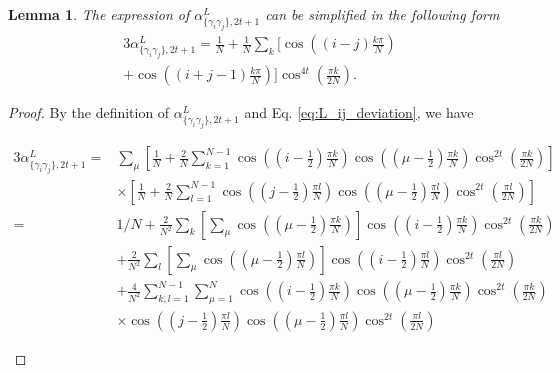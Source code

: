 \documentclass[showpacs,twocolumn,aps,prx,long bibliography,superscriptaddress,notitlepage]{revtex4-1}
\newtheorem{lemma}{Lemma}
\newcommand{\alpl}{\alpha_{\{\gamma_i\gamma_j\}, 2t+1}^{L}}
\begin{document}
\begin{lemma}
\label{lemma: simplification of alpha L}
The expression of $\alpl$ can be simplified in the following form
    \begin{equation}
    \label{eq: alpha L}
        \begin{aligned}
            3\alpl=\frac{1}{N}+\frac{1}{N} \sum_k\Big[\cos \left((i-j) \frac{k \pi}{N}\right) \\
        +\cos \left((i+j-1) \frac{k \pi}{N}\right)\Big] \cos ^{4 t}\left(\frac{\pi k}{2 N}\right).
        \end{aligned}
    \end{equation}
\end{lemma}
\begin{proof}
By the definition of $\alpl$ and Eq. \ref{eq:L_ij_deviation}, we have
\begin{widetext}

\begin{align}
    3\alpl =& \sum_\mu \left[ \frac{1}{N} + \frac{2}{N} \sum_{k=1}^{N-1} \cos \left(\left(i-\frac{1}{2}\right) \frac{\pi k}{N}\right) \cos \left(\left(\mu-\frac{1}{2}\right) \frac{\pi k}{N}\right) \cos ^{2 t} \left( \frac{\pi k}{2 N} \right)\right] \nonumber\\
     &\times\left[ \frac{1}{N} + \frac{2}{N} \sum_{l=1}^{N-1} \cos \left(\left(j-\frac{1}{2}\right) \frac{\pi l}{N}\right) \cos \left(\left(\mu-\frac{1}{2}\right) \frac{\pi l}{N}\right) \cos ^{2 t}\left( \frac{\pi l}{2 N} \right)  \right] \nonumber\\
     =& 1/N + \frac{2}{N^2} \sum_k \left[\sum_\mu \cos\left(\left(\mu-\frac{1}{2}\right) \frac{\pi k}{N}\right)  \right] 
     \cos \left(\left(i-\frac{1}{2}\right) \frac{\pi k}{N}\right) \cos ^{2 t} \left( \frac{\pi k}{2 N} \right) 
     \label{eq: zz anonymous 9}
     \\
     &+ \frac{2}{N^2} \sum_l \left[\sum_\mu \cos\left(\left(\mu-\frac{1}{2}\right) \frac{\pi l}{N}\right)  \right] 
     \cos \left(\left(i-\frac{1}{2}\right) \frac{\pi l}{N}\right) \cos ^{2 t} \left( \frac{\pi l}{2 N} \right) 
     \label{eq: zz anonymous 10}
     \\
     &+ \frac{4}{N^2} \sum_{k,l =1}^{N-1} \sum_{\mu = 1}^{N} \cos \left(\left(i-\frac{1}{2}\right) \frac{\pi k}{N}\right) \cos \left(\left(\mu-\frac{1}{2}\right) \frac{\pi k}{N}\right) \cos ^{2 t} \left( \frac{\pi k}{2 N} \right)  \nonumber\\
     &\times \cos \left(\left(j-\frac{1}{2}\right) \frac{\pi l}{N}\right) \cos \left(\left(\mu-\frac{1}{2}\right) \frac{\pi l}{N}\right) \cos ^{2 t}\left( \frac{\pi l}{2 N} \right)  
     \label{eq: calculation of alpha L}
\end{align}



\end{widetext}
\end{proof}
\end{document}
